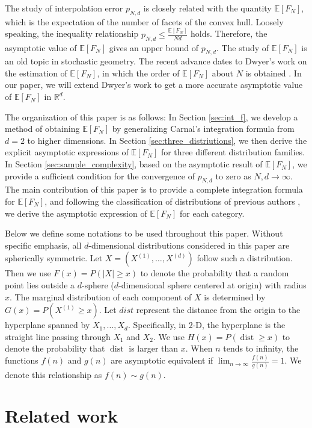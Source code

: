 \documentclass[conference,a4paper]{IEEEtran}
\DeclareMathOperator{\dist}{dist}
\def\E{\mathbb{E}}
\def\R{\mathbb{R}}
\begin{document}
The study of interpolation error $p_{N,d}$ is closely related with the quantity $\E[F_N]$,
which is the expectation of the number of facets of the convex hull. Loosely speaking,
the inequality relationship $p_{N,d} \leq \frac{\E[F_N]}{Nd}$ holds. Therefore, the asymptotic
value of $\E[F_N]$ gives an upper bound of $p_{N,d}$.
The study of $\E[F_N]$
is an old topic in stochastic geometry. The recent advance dates to Dwyer's work on the estimation of $\E[F_N]$,
in which the order of $\E[F_N]$ about $N$ is obtained \cite{dwyer1991convex}. In our paper, we will extend Dwyer's work
to get a more accurate asymptotic value of $\E[F_N]$ in $\R^d$.

The organization of this paper is as follows: In Section \ref{sec:int_f}, we develop a method of obtaining $\E[F_N]$ by generalizing Carnal's integration formula
from $d=2$ to higher dimensions.
In Section \ref{sec:three_distriutions}, we then derive the explicit asymptotic
expressions of $\E[F_N]$ for three different distribution families.
In Section \ref{sec:sample_complexity}, based on the asymptotic result of $\E[F_N]$,
we provide a sufficient condition for the convergence of $p_{N,d}$ to zero as $N,d \to \infty$.
The main contribution of this paper is to provide a complete integration formula for $\E[F_N]$,
and following the classification of distributions of previous authors \cite{carnal1970konvexe,dwyer1991convex},
we derive the asymptotic expression
of $\E[F_N]$ for each category.

Below we define some notations to be used throughout this paper.
Without specific emphasis, all $d$-dimensional distributions considered in this paper are spherically symmetric.
Let $X=(X^{(1)},\dots, X^{(d)})$ follow such a distribution.
Then we use $F(x)=P(|X|\geq x)$ to denote the probability that a random point lies outside
a $d$-sphere ($d$-dimensional sphere centered at origin) with radius $x$.
The marginal distribution of each component of $X$ is determined by $G(x)=P(X^{(1)}\geq x)$.
Let $dist$ represent the distance from the origin to the hyperplane spanned by $X_1, \dots, X_d$.
Specifically, in 2-D, the hyperplane is the straight line passing through $X_1$ and $X_2$.
We use $H(x)=P(\dist\geq x)$ to denote the probability that $\dist$ is larger than $x$.
When $n$ tends to infinity, the functions $f(n)$ and $g(n)$ are asymptotic equivalent if $\lim_{n\to \infty} \frac{f(n)}{g(n)}=1$.
We denote this relationship as $f(n) \sim g(n)$.
\section{Related work}
\end{document}
